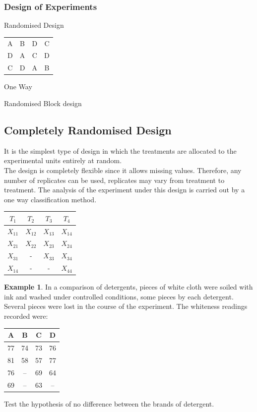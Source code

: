 \documentclass[11pt,a4paper]{article}
\theoremstyle{definition}
\newtheorem{example}[thm]{Example}
\begin{document}
\subsubsection{Design of Experiments}

\begin{table}[H]
\centering
Randomised Design
\begin{tabular}{|cccc|}
\hline
A&B&D&C\\
D&A&C&D\\
C&D&A&B\\
\hline
\end{tabular}
One Way
\end{table}

Randomised Block design\\






\subsection{Completely Randomised Design}
It is the simplest type of design in which the treatments are allocated to the experimental units entirely at random.\\ The design is completely flexible since it allows missing values. Therefore, any number of replicates can be used, replicates may vary from treatment to treatment. The analysis of the experiment under this design is carried out by a one way classification method.

\begin{table}[H]
\centering
\begin{tabular}{c|c|c|c}
$T_1$ & $T_2$ & $T_3$ & $T_4$\\
\hline $X_{11}$ & $X_{12}$ & $X_{13}$ & $X_{14}$\\
$X_{21}$ & $X_{22}$ & $X_{23}$ & $X_{24}$\\
$X_{31}$ & -& $X_{33}$ & $X_{34}$\\
$X_{14}$ &-&-&$X_{44}$\\
\end{tabular}
\end{table}

\begin{example}
In a comparison of detergents, pieces of white cloth were soiled with ink and washed under
controlled conditions, some pieces by each detergent. Several pieces were lost in the course
of the experiment. The whiteness readings recorded were:
\begin{table}[H]
\centering
\begin{tabular}{cccc}
A & B & C & D\\
\hline
77 & 74 & 73 & 76\\
81 & 58 & 57 & 77\\
76 & -- & 69 & 64\\
69 & -- & 63 & --\\
\end{tabular}
\end{table}
Test the hypothesis of no difference between the brands of detergent.
\end{example}
\end{document}
